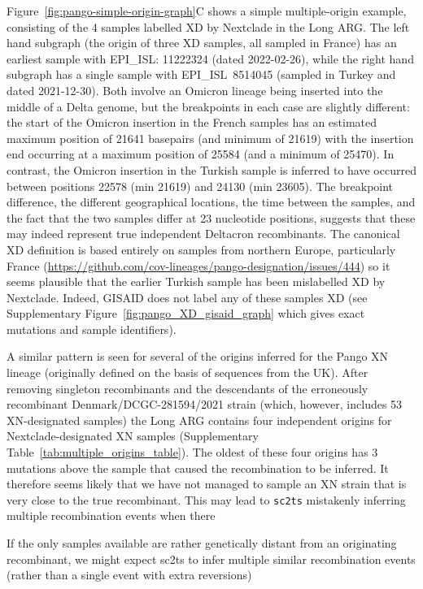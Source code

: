 \documentclass{article}
\begin{document}
Figure~\ref{fig:pango-simple-origin-graph}C shows a simple multiple-origin example, consisting of
the 4 samples labelled XD by Nextclade in the Long ARG. The left hand subgraph
(the origin of three XD samples, all sampled in France) has an earliest
sample with EPI\_ISL: 11222324 (dated 2022-02-26), while the right hand
subgraph has a single sample with EPI\_ISL~8514045 (sampled in Turkey and dated 2021-12-30).
Both involve an Omicron lineage being inserted into the middle of a Delta genome, but
the breakpoints in each case are slightly different: the start of the Omicron insertion
in the French samples has an estimated maximum position of 21641 basepairs
(and minimum of 21619) with the insertion end occurring at a maximum position of 25584
(and a minimum of 25470). In contrast, the Omicron insertion in the Turkish sample
is inferred to have occurred between positions 22578 (min 21619) and 24130 (min 23605).
The breakpoint difference, the different geographical locations, the time between the
samples, and the fact that the two samples differ at 23 nucleotide positions,
suggests that these may indeed represent true independent Deltacron recombinants.
The canonical XD definition is based entirely on samples from northern Europe, particularly
France (\url{https://github.com/cov-lineages/pango-designation/issues/444}) so it seems
plausible that the earlier Turkish sample has been mislabelled XD by Nextclade.
Indeed, GISAID does not label any of these samples XD (see Supplementary
Figure~\ref{fig:pango_XD_gisaid_graph} which gives exact mutations and sample identifiers).

A similar pattern is seen for several of the origins inferred for the Pango
XN lineage (originally defined on the basis of sequences from the UK). After removing
singleton recombinants and the descendants of the erroneously recombinant
Denmark/DCGC-281594/2021 strain (which, however, includes 53 XN-designated samples)
the Long ARG contains four independent origins for Nextclade-designated XN
samples (Supplementary Table~\ref{tab:multiple_origins_table}). The oldest
of these four origins has 3 mutations above the sample that caused the
recombination to be inferred. It therefore seems likely that we have not managed
to sample an XN strain that is very close to the true recombinant. This may
lead to \texttt{sc2ts} mistakenly inferring multiple recombination events when there


If the only samples available are rather genetically distant from an originating
recombinant, we might expect sc2ts to infer multiple similar recombination events
(rather than a single event with extra reversions)
\end{document}
